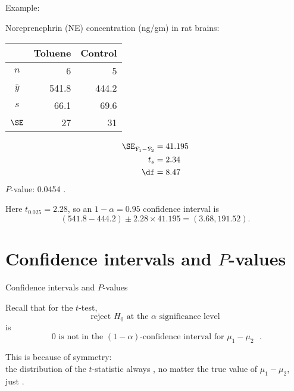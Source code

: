 \begin{frame}{Example: }

    Noreprenephrin (NE) concentration (ng/gm) in rat brains:
    \begin{center}
      \begin{tabular}{c|rr}
            & Toluene & Control \\
          \hline
          $n$ & 6 & 5 \\
          $\bar y$ & 541.8 & 444.2 \\
          $s$  & 66.1 & 69.6 \\
          $\SE$ & 27 & 31 \\
     \end{tabular}
   \end{center}


     \begin{align*}
         \SE_{\bar Y_1 - \bar Y_2} &= 41.195 \\
         t_s &= 2.34  \\
         \df &= 8.47 
     \end{align*}
     $P$-value: 0.0454 .


  \vspace{2em}

  Here $t_{0.025} = 2.28$, so an $1-\alpha=0.95$ confidence interval is
  \[  (541.8-444.2) \pm 2.28 \times 41.195 = (3.68,191.52) . \]

\end{frame}

\section{Confidence intervals and $P$-values}


\begin{frame}{Confidence intervals and $P$-values}

    Recall that
  for the $t$-test,
  \[  \text{reject $H_0$ at the $\alpha$ significance level} \]
  is 
  \[  \text{ 0 is not in the $(1-\alpha)$-confidence interval for $\mu_1-\mu_2$ }. \]

  \vspace{2em}

  This is because of \alert{symmetry}: \\
  the distribution of the $t$-statistic always ,
  no matter the true value of $\mu_1 - \mu_2$,
  just .

\end{frame}

